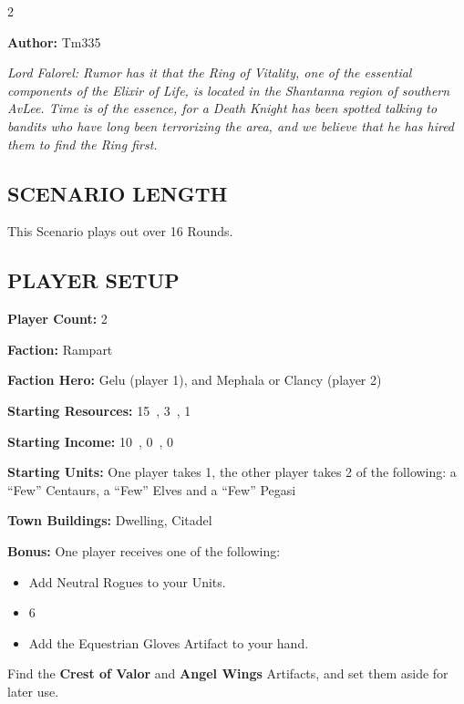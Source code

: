 
\begin{multicols*}{2}

\textbf{Author:} Tm335

\textit{Lord Falorel: Rumor has it that the Ring of Vitality, one of the essential components of the Elixir of Life, is located in the Shantanna region of southern AvLee.
  Time is of the essence, for a Death Knight has been spotted talking to bandits who have long been terrorizing the area, and we believe that he has hired them to find the Ring first.
}


\subsection*{\MakeUppercase{Scenario Length}}

This Scenario plays out over 16 Rounds.

\subsection*{\MakeUppercase{Player Setup}}

\textbf{Player Count:} 2

\textbf{Faction:} Rampart

\textbf{Faction Hero:} Gelu (player 1), and Mephala or Clancy (player 2)

\textbf{Starting Resources:} 15~, 3~, 1~

\textbf{Starting Income:} 10~, 0~, 0~

\textbf{Starting Units:} One player takes 1, the other player takes 2 of the following: a ``Few'' Centaurs, a ``Few'' Elves and a ``Few'' Pegasi

\textbf{Town Buildings:}  Dwelling, Citadel

\textbf{Bonus:} One player receives one of the following:
\begin{itemize}
  \item Add Neutral  Rogues to your Units.
  \item 6~
  \item Add the Equestrian Gloves Artifact to your hand.
\end{itemize}

Find the \textbf{Crest of Valor} and \textbf{Angel Wings} Artifacts, and set them aside for later use.


\end{multicols*}
